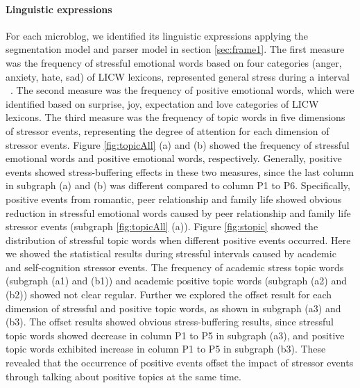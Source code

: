 \paragraph{\textbf{Linguistic expressions}}
For each microblog, we identified its linguistic expressions
applying the segmentation model and parser model in section \ref{sec:frame1}.
The first measure was the frequency of stressful emotional words based on four categories (anger, anxiety, hate, sad) of LICW lexicons, represented general stress during a interval ~\citep{Tausczik2010The}.
The second measure was the frequency of positive emotional words,
which were identified based on surprise, joy, expectation and love categories of LICW lexicons.
The third measure was the frequency of topic words in five dimensions of stressor events,
representing the degree of attention for each dimension of stressor events.
Figure \ref{fig:topicAll} (a) and (b) showed the frequency of stressful emotional words and positive emotional words, respectively.
Generally, positive events showed stress-buffering effects in these two measures,
since the last column in subgraph (a) and (b) was different compared to column P1 to P6.
Specifically, positive events from romantic, peer relationship and family life showed obvious
reduction in stressful emotional words caused by
peer relationship and family life stressor events (subgraph \ref{fig:topicAll} (a)).
Figure \ref{fig:stopic} showed the distribution of stressful topic words when different positive events occurred.
Here we showed the statistical results during stressful intervals caused by academic and self-cognition stressor events.
The frequency of academic stress topic words (subgraph (a1) and (b1))
and academic positive topic words (subgraph (a2) and (b2)) showed not clear regular.
Further we explored the offset result for each dimension of stressful and positive topic words,
as shown in subgraph (a3) and (b3).
The offset results showed obvious stress-buffering results,
since stressful topic words showed decrease in column P1 to P5 in subgraph (a3),
and positive topic words exhibited increase in column P1 to P5 in subgraph (b3).
These revealed that the occurrence of positive events offset the impact of stressor events through talking about positive topics at the same time.

